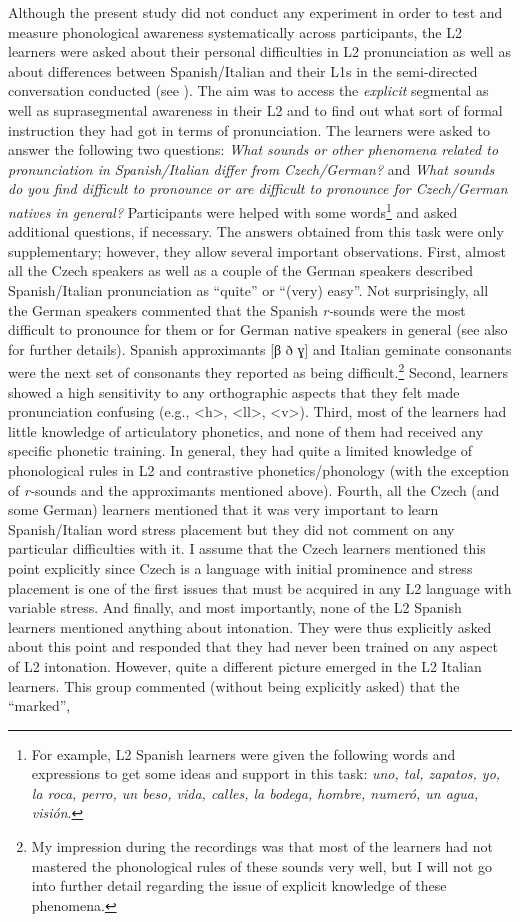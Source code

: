 Although the present study did not conduct any experiment in order to test and measure phonological awareness systematically across participants, the L2 learners were asked about their personal difficulties in L2 pronunciation as well as about differences between Spanish/Italian and their L1s in the semi-directed conversation conducted (see ). The aim was to access the \textit{explicit} segmental as well as suprasegmental awareness in their L2 and to find out what sort of formal instruction they had got in terms of pronunciation. The learners were asked to answer the following two questions: \textit{What sounds or other phenomena related to pronunciation in Spanish\slash Italian differ from Czech\slash German?} and \textit{What sounds do you find difficult to pronounce or are difficult to pronounce for Czech\slash German natives in general?} Participants were helped with some words\footnote{For example, L2 Spanish learners were given the following words and expressions to get some ideas and support in this task: \textit{uno, tal, zapatos, yo, la roca, perro, un beso, vida, calles, la bodega, hombre, numeró, un agua, visión}.} and asked additional questions, if necessary. The answers obtained from this task were only supplementary; however, they allow several important observations. First, almost all the Czech speakers as well as a couple of the German speakers described Spanish/Italian pronunciation as “quite” or “(very) easy”. Not surprisingly, all the German speakers commented that the Spanish \textit{r-}sounds were the most difficult to pronounce for them or for German native speakers in general (see also  for further details). Spanish approximants [β ð ɣ] and Italian geminate consonants were the next set of consonants they reported as being difficult.\footnote{My impression during the recordings was that most of the learners had not mastered the phonological rules of these sounds very well, but I will not go into further detail regarding the issue of explicit knowledge of these phenomena.} Second, learners showed a high sensitivity to any orthographic aspects that they felt made pronunciation confusing (e.g., <h>, <ll>, <v>). Third, most of the learners had little knowledge of articulatory phonetics, and none of them had received any specific phonetic training. In general, they had quite a limited knowledge of phonological rules in L2 and contrastive phonetics/phonology (with the exception of \textit{r-}sounds and the approximants mentioned above). Fourth, all the Czech (and some German) learners mentioned that it was very important to learn Spanish/Italian word stress placement but they did not comment on any particular difficulties with it. I assume that the Czech learners mentioned this point explicitly since Czech is a language with initial prominence and stress placement is one of the first issues that must be acquired in any L2 language with variable stress. And finally, and most importantly, none of the L2 Spanish learners mentioned anything about intonation. They were thus explicitly asked about this point and responded that they had never been trained on any aspect of L2 intonation. However, quite a different picture emerged in the L2 Italian learners. This group commented (without being explicitly asked) that the “marked”, 